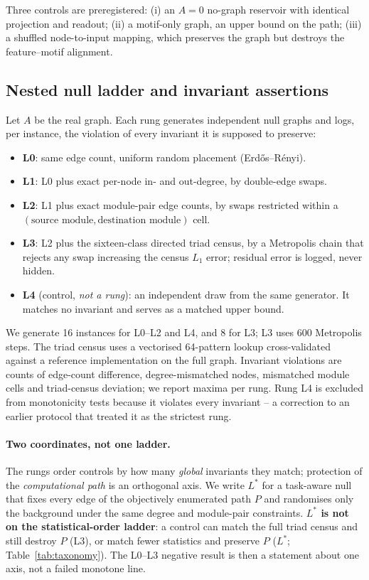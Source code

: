 \documentclass[10pt,twocolumn,letterpaper]{article}
\begin{document}
Three controls are preregistered: (i) an $A=0$ no-graph reservoir with
identical projection and readout; (ii) a motif-only graph, an upper bound on
the path; (iii) a shuffled node-to-input mapping, which preserves the graph
but destroys the feature--motif alignment.

\subsection{Nested null ladder and invariant assertions}
\label{sec:ladder}

Let $A$ be the real graph. Each rung generates independent null graphs and
logs, per instance, the violation of every invariant it is supposed to
preserve:

\begin{itemize}
\item \textbf{L0}: same edge count, uniform random placement (Erd\H{o}s--R\'enyi).
\item \textbf{L1}: L0 plus exact per-node in- and out-degree, by double-edge swaps.
\item \textbf{L2}: L1 plus exact module-pair edge counts, by swaps restricted
  within a $(\text{source module},\text{destination module})$ cell.
\item \textbf{L3}: L2 plus the sixteen-class directed triad census, by a
  Metropolis chain that rejects any swap increasing the census $L_1$ error;
  residual error is logged, never hidden.
\item \textbf{L4} (control, \emph{not a rung}): an independent draw from the
  same generator. It matches no invariant and serves as a matched upper bound.
\end{itemize}

We generate 16 instances for L0--L2 and L4, and 8 for L3;
L3 uses 600 Metropolis steps. The triad census uses a vectorised 64-pattern
lookup cross-validated against a reference implementation on the full graph.
Invariant violations are counts of edge-count difference, degree-mismatched
nodes, mismatched module cells and triad-census deviation; we report maxima
per rung. Rung L4 is excluded from monotonicity tests because it violates
every invariant -- a correction to an earlier protocol that treated it as the
strictest rung.

\paragraph{Two coordinates, not one ladder.}
The rungs order controls by how many \emph{global} invariants they match;
protection of the \emph{computational path} is an orthogonal axis. We write
$L^*$ for a task-aware null that fixes every edge of the objectively enumerated
path $P$ and randomises only the background under the same degree and
module-pair constraints. \textbf{$L^*$ is not on the statistical-order
ladder}: a control can match the full triad census and still destroy $P$ (L3),
or match fewer statistics and preserve $P$ ($L^*$;
Table~\ref{tab:taxonomy}). The L0--L3 negative result is then a statement
about one axis, not a failed monotone line.
\end{document}
